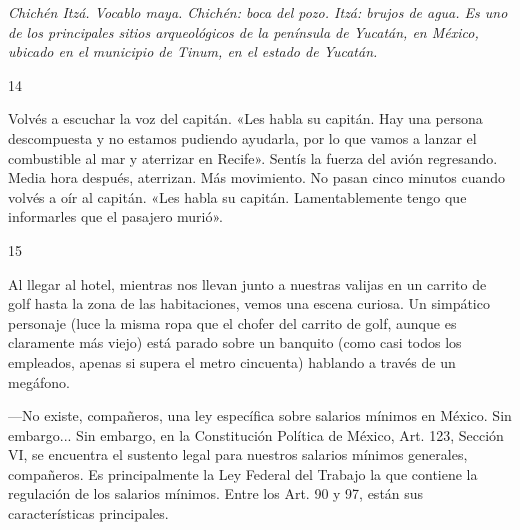 \documentclass[12pt,twoside,openright,a5paper]{book}
\begin{document}
\nopagebreak

\emph{Chichén Itzá. Vocablo maya. Chichén: \emph{boca del pozo}. Itzá: \emph{brujos de agua}.
Es uno de los principales sitios arqueológicos de la península de Yucatán,
en México, ubicado en el municipio de Tinum, en el estado de Yucatán.}

\vspace{0.5cm}
\afterpage{}
\hrulefill \hspace{0.1cm}\decofourleft\hspace{0.2cm} 14 \hspace{0.2cm}\decofourright \hspace{0.1cm}\hrulefill

\nopagebreak

\vspace{0.5cm}

\nopagebreak

Volvés a escuchar la voz del capitán. «Les habla su capitán. Hay una
persona descompuesta y no estamos pudiendo ayudarla, por lo que vamos a
lanzar el combustible al mar y aterrizar en Recife». Sentís la fuerza del
avión regresando. Media hora después, aterrizan. Más movimiento. No pasan
cinco minutos cuando volvés a oír al capitán. «Les habla su capitán.
Lamentablemente tengo que informarles que el pasajero murió».

\vspace{0.5cm}

\hrulefill \hspace{0.1cm}\decofourleft\hspace{0.2cm} 15 \hspace{0.2cm}\decofourright \hspace{0.1cm}\hrulefill

\nopagebreak

\vspace{0.5cm}

\nopagebreak


Al llegar al hotel,
mientras nos llevan junto a nuestras valijas en un carrito de golf hasta
la zona de las habitaciones, vemos una escena curiosa. Un simpático personaje
(luce la misma ropa que el chofer del carrito de golf, aunque es claramente
más viejo) está parado sobre un banquito (como casi todos los empleados,
apenas si supera el metro cincuenta) hablando a través de un megáfono.

---No existe, compañeros, una ley específica sobre salarios mínimos en
México. Sin embargo... Sin embargo, en la Constitución Política de México,
Art. 123, Sección VI, se encuentra el sustento legal para nuestros
salarios mínimos generales, compañeros. Es principalmente la Ley Federal
del Trabajo la que contiene la regulación de los salarios mínimos.
Entre los Art. 90 y 97, están sus características principales.
\end{document}
